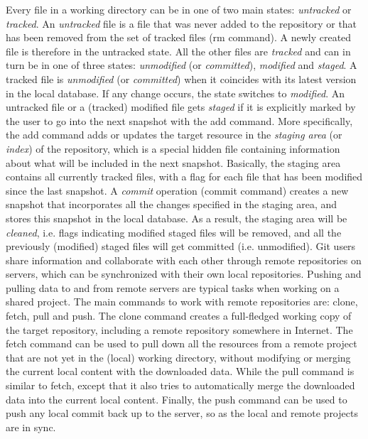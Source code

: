 Every file in a working directory can be in one of two main states: \emph{untracked} or \emph{tracked}.
An \emph{untracked} file is a file that was never added to the repository or that has been removed from the set of tracked files (\textsf{rm} command).
A newly created file is therefore in the untracked state.
All the other files are \emph{tracked} and can in turn be in one of three states: \emph{unmodified} (or \emph{committed}), \emph{modified} and \emph{staged}.
A tracked file is \emph{unmodified} (or \emph{committed}) when it coincides with its latest version in the local database.
If any change occurs, the state switches to \emph{modified}.
An untracked file or a (tracked) modified file gets \emph{staged} if it is explicitly marked by the user to go into the next snapshot with the \textsf{add} command.
More specifically, the \textsf{add} command adds or updates the target resource in the \emph{staging area} (or \emph{index}) of the repository, which is a special hidden file containing information about what will be included in the next snapshot.
Basically, the staging area contains all currently tracked files, with a flag for each file that has been modified since the last snapshot.
A \emph{commit} operation (\textsf{commit} command) creates a new snapshot that incorporates all the changes specified in the staging area, and stores this snapshot in the local database.
As a result, the staging area will be \emph{cleaned}, i.e. flags indicating modified staged files will be removed, and all the previously (modified) staged files will get committed (i.e. unmodified).
Git users share information and collaborate with each other through remote repositories on servers, which can be synchronized with their own local repositories.
Pushing and pulling data to and from remote servers are typical tasks when working on a shared project.
The main commands to work with remote repositories are: \textsf{clone}, \textsf{fetch}, \textsf{pull} and \textsf{push}.
The \textsf{clone} command creates a full-fledged working copy of the target repository, including a remote repository somewhere in Internet.
The \textsf{fetch} command can be used to pull down all the resources from a remote project that are not yet in the (local) working directory, without modifying or merging the current local content with the downloaded data.
While the \textsf{pull} command is similar to \textsf{fetch}, except that it also tries to automatically merge the downloaded data into the current local content.
Finally, the \textsf{push} command can be used to push any local commit back up to the server, so as the local and remote projects are in sync.

